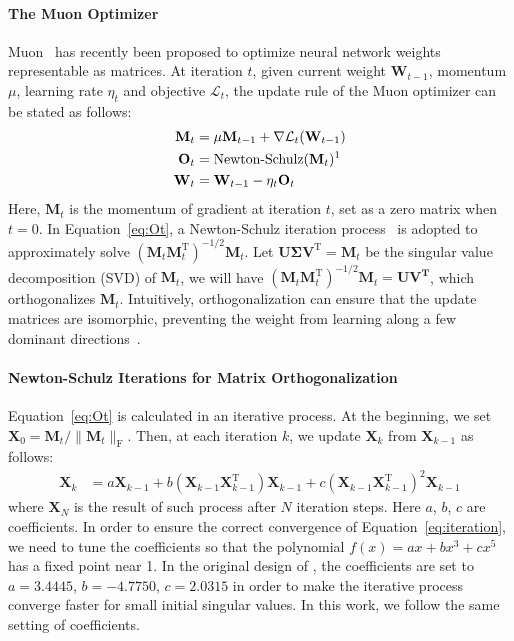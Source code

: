 \paragraph{The Muon Optimizer}
\label{sec:analysis:background}
Muon~\citep{jordan2024muon} has recently been proposed to optimize neural network weights representable as matrices. At iteration $t$, given current weight $\mathbf{W}_{t-1}$, momentum $\mu$, learning rate $\eta_t$ and objective $\mathcal{L}_t$, the update rule of the Muon optimizer can be stated as follows:
\begin{align}
    \mathbf{M}_t &= \mu \mathbf{M}_{t-1} + \nabla\mathcal{L}_t(\mathbf{W}_{t-1}) \notag \\
    \mathbf{O}_t &= \text{Newton-Schulz}(\mathbf{M}_t)\text{\footnotemark[1]} \label{eq:Ot}\\
    \mathbf{W}_t &= \mathbf{W}_{t-1} - \eta_t \mathbf{O}_t \notag
\end{align}
 Here, $\mathbf{M}_t$ is the momentum of gradient at iteration $t$, set as a zero matrix when $t = 0$. In Equation~\ref{eq:Ot}, a Newton-Schulz iteration process~\citep{bernstein2024oldoptimizernewnorm} is adopted to approximately solve $(\mathbf{M}_t \mathbf{M}^{\mathrm{T}}_t)^{-1/2}\mathbf{M}_t$. Let $\mathbf{U}\mathbf{\Sigma} \mathbf{V}^\mathrm{T} = \mathbf{M}_t$ be the singular value decomposition (SVD) of $\mathbf{M}_t$, we will have $(\mathbf{M}_t \mathbf{M}^{\mathrm{T}}_t)^{-1/2}\mathbf{M}_t = \mathbf{U}\mathbf{V^T}$, which orthogonalizes $\mathbf{M}_t$. Intuitively, orthogonalization can ensure that the update matrices are isomorphic, preventing the weight from learning along a few dominant directions~\citep{jordan2024muon}.

\paragraph{Newton-Schulz Iterations for Matrix Orthogonalization}
Equation~\ref{eq:Ot} is calculated in an iterative process. At the beginning, we set $\mathbf{X}_0 = \mathbf{M}_t / \|\mathbf{M}_t\|_\mathrm{F}$. Then, at each iteration $k$, we update $\mathbf{X}_k$ from $\mathbf{X}_{k-1}$ as follows:
\begin{align}
    \mathbf{X}_k &= a \mathbf{X}_{k-1} + b (\mathbf{X}_{k-1} \mathbf{X}_{k-1}^\mathrm{T}) \mathbf{X}_{k-1} + c (\mathbf{X}_{k-1} \mathbf{X}_{k-1}^\mathrm{T})^2 \mathbf{X}_{k-1} \label{eq:iteration}
\end{align}
where $\mathbf{X}_N$ is the result of such process after $N$ iteration steps.
Here $a$, $b$, $c$ are coefficients. In order to ensure the correct convergence of Equation~\ref{eq:iteration}, we need to tune the coefficients so that the polynomial $f(x) = a x + b x^3 + c x^5$ has a fixed point near 1. In the original design of \cite{jordan2024muon}, the coefficients are set to $a = 3.4445$, $b = -4.7750$, $c = 2.0315$ in order to make the iterative process converge faster for small initial singular values. In this work, we follow the same setting of coefficients.

